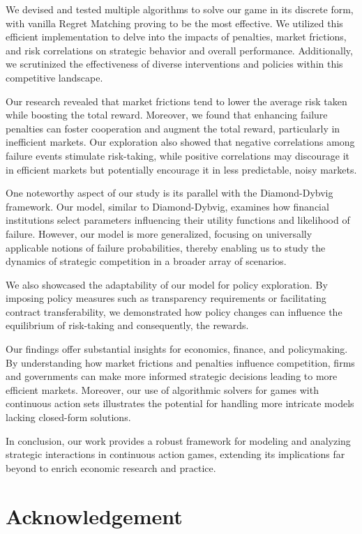 \documentclass[preprint,12pt,authoryear]{elsarticle}
\theoremstyle{definition}
\begin{document}
We devised and tested multiple algorithms to solve our game in its discrete form, with vanilla Regret Matching proving to be the most effective. We utilized this efficient implementation to delve into the impacts of penalties, market frictions, and risk correlations on strategic behavior and overall performance. Additionally, we scrutinized the effectiveness of diverse interventions and policies within this competitive landscape.

Our research revealed that market frictions tend to lower the average risk taken while boosting the total reward. Moreover, we found that enhancing failure penalties can foster cooperation and augment the total reward, particularly in inefficient markets. Our exploration also showed that negative correlations among failure events stimulate risk-taking, while positive correlations may discourage it in efficient markets but potentially encourage it in less predictable, noisy markets.

One noteworthy aspect of our study is its parallel with the Diamond-Dybvig framework. Our model, similar to Diamond-Dybvig, examines how financial institutions select parameters influencing their utility functions and likelihood of failure. However, our model is more generalized, focusing on universally applicable notions of failure probabilities, thereby enabling us to study the dynamics of strategic competition in a broader array of scenarios.

We also showcased the adaptability of our model for policy exploration. By imposing policy measures such as transparency requirements or facilitating contract transferability, we demonstrated how policy changes can influence the equilibrium of risk-taking and consequently, the rewards.

Our findings offer substantial insights for economics, finance, and policymaking. By understanding how market frictions and penalties influence competition, firms and governments can make more informed strategic decisions leading to more efficient markets. Moreover, our use of algorithmic solvers for games with continuous action sets illustrates the potential for handling more intricate models lacking closed-form solutions. 

In conclusion, our work provides a robust framework for modeling and analyzing strategic interactions in continuous action games, extending its implications far beyond to enrich economic research and practice.

\section*{Acknowledgement}
\end{document}
